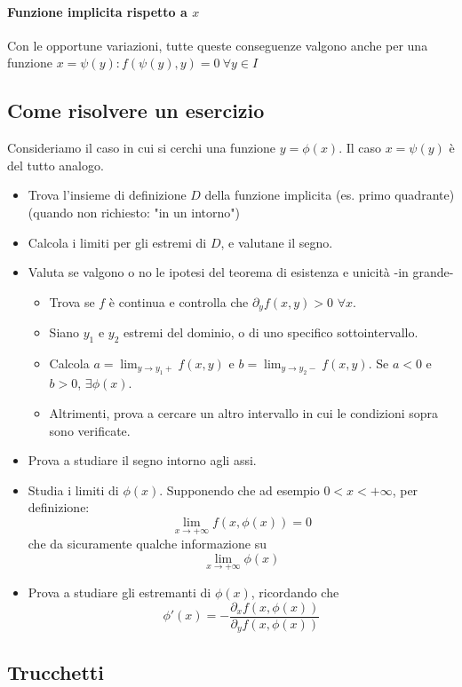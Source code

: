 \documentclass[a4paper,12pt]{article}
\begin{document}
\paragraph{Funzione implicita rispetto a $x$}
Con le opportune variazioni, tutte queste conseguenze valgono anche per una funzione $x = \psi(y): f(\psi(y), y) = 0\ \forall y \in I$
\subsection{Come risolvere un esercizio}
Consideriamo il caso in cui si cerchi una funzione $y=\phi(x)$. Il caso $x=\psi(y)$ è del tutto analogo.
\begin{itemize}
 \item Trova l'insieme di definizione $D$ della funzione implicita (es. primo quadrante) (quando non richiesto: "in un intorno")
 \item Calcola i limiti per gli estremi di $D$, e valutane il segno.
 \item Valuta se valgono o no le ipotesi del teorema di esistenza e unicità -in grande-
 \begin{itemize}
  \item Trova se $f$ è continua e controlla che $\partial_y f(x, y) > 0$ $\forall x$.
  \item Siano $y_1$ e $y_2$ estremi del dominio, o di uno specifico sottointervallo.
  \item Calcola $a = \displaystyle\lim_{y \to y_1+}{f(x, y)}$ e $b = \displaystyle\lim_{y \to y_2-}{f(x, y)}$. Se $a < 0$ e $b > 0$, $\exists \phi(x)$.
  \item Altrimenti, prova a cercare un altro intervallo in cui le condizioni sopra sono verificate.
 \end{itemize}
 \item Prova a studiare il segno intorno agli assi.
 \item Studia i limiti di $\phi(x)$. Supponendo che ad esempio $0 < x < +\infty$, per definizione:
	 $$ \lim_{x \to +\infty} f(x, \phi(x)) = 0$$
	 che da sicuramente qualche informazione su
	 $$ \lim_{x \to +\infty} \phi(x) $$
 \item Prova a studiare gli estremanti di $\phi(x)$, ricordando che
 	 $$\phi'(x) = -\dfrac{\partial_x f(x, \phi(x))}{\partial_y f(x, \phi(x))}$$
\end{itemize}

\subsection{Trucchetti}
\end{document}
